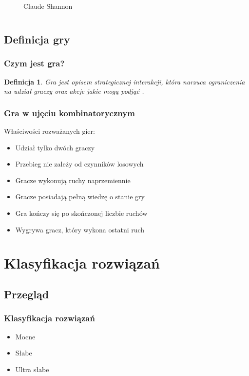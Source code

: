 \documentclass[polish,envcountsect,10pt]{beamer}
\newtheorem{mdfn}{Definicja}
\begin{document}
\begin{frame}
\begin{columns}
\begin{figure}[H]
                        \caption{Claude Shannon}
                    \end{figure}
                \end{columns}
            \end{frame}
        \subsection{Definicja gry}
            \begin{frame}
                \frametitle{Czym jest gra?}
                    \begin{mdfn}
                        Gra jest opisem strategicznej interakcji, która narzuca ograniczenia na udział graczy oraz akcje jakie mogą podjąć \cite{course_gt}.
                    \end{mdfn}
            \end{frame}
            \begin{frame}
                \frametitle{Gra w ujęciu kombinatorycznym}
                Właściwości rozważanych gier:
                \begin{itemize}
                    \item<2-> Udział tylko dwóch graczy
                    \item<3-> Przebieg nie zależy od czynników losowych
                    \item<4-> Gracze wykonują ruchy naprzemiennie
                    \item<5-> Gracze posiadają pełną wiedzę o stanie gry
                    \item<6-> Gra kończy się po skończonej liczbie ruchów
                    \item<7-> Wygrywa gracz, który wykona ostatni ruch
                \end{itemize}
            \end{frame}
    \section{Klasyfikacja rozwiązań}
        \subsection{Przegląd}
            \begin{frame}
                \frametitle{Klasyfikacja rozwiązań}
                \begin{itemize}
                    \item<1-> Mocne
                    \item<2-> Słabe
                    \item<3-> Ultra słabe
                \end{itemize}
            \end{frame}
\end{document}
